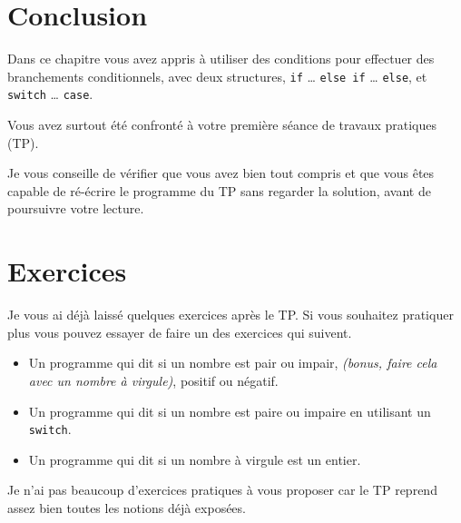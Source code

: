 \section*{Conclusion}
{}
Dans ce chapitre vous avez appris à utiliser des conditions pour effectuer des branchements conditionnels, avec deux structures, \texttt{if} … \texttt{else if} … \texttt{else}, et \texttt{switch} … \texttt{case}.

Vous avez surtout été confronté à votre première séance de travaux pratiques (TP).

Je vous conseille de vérifier que vous avez bien tout compris et que vous êtes capable de ré-écrire le programme du TP sans regarder la solution, avant de poursuivre votre lecture.

\section*{Exercices}
{}
Je vous ai déjà laissé quelques exercices après le TP.
Si vous souhaitez pratiquer plus vous pouvez essayer de faire un des exercices qui suivent.
\begin{itemize}
\item Un programme qui dit si un nombre est pair ou impair,
\emph{(bonus, faire cela avec un nombre à virgule)}, positif ou négatif.
\item Un programme qui dit si un nombre est paire ou impaire en utilisant un \texttt{switch}.
\item Un programme qui dit si un nombre à virgule est un entier.
\end{itemize}

Je n'ai pas beaucoup d'exercices pratiques à vous proposer car le TP reprend assez bien toutes les notions déjà exposées.

